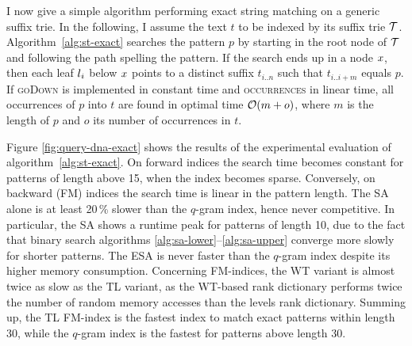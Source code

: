 I now give a simple algorithm performing exact string matching on a generic suffix trie.
In the following, I assume the text $t$ to be indexed by its suffix trie $\mathcal {T}$.
Algorithm~\ref{alg:st-exact} searches the pattern $p$ by starting in the root node of $\mathcal {T}$ and following the path spelling the pattern.
If the search ends up in a node $x$, then each leaf $l_i$ below $x$ points to a distinct suffix $t_{i..n}$ such that $t_{i..i+m}$ equals $p$.
If \textsc{goDown} is implemented in constant time and \textsc{occurrences} in linear time, all occurrences of $p$ into $t$ are found in optimal time $\mathcal{O}(m+o)$, where $m$ is the length of $p$ and $o$ its number of occurrences in $t$.

Figure \ref{fig:query-dna-exact} shows the results of the experimental evaluation of algorithm~\ref{alg:st-exact}.
On forward indices the search time becomes constant for patterns of length above 15, \ie when the index becomes sparse.
Conversely, on backward (FM) indices the search time is linear in the pattern length. 
The SA alone is at least 20\,\% slower than the $q$-gram index, hence never competitive.
In particular, the SA shows a runtime peak for patterns of length 10, due to the fact that binary search algorithms \ref{alg:sa-lower}--\ref{alg:sa-upper} converge more slowly for shorter patterns.
The ESA is never faster than the $q$-gram index despite its higher memory consumption.
Concerning FM-indices, the WT variant is almost twice as slow as the TL variant, as the WT-based rank dictionary performs twice the number of random memory accesses than the levels rank dictionary.
Summing up, the TL FM-index is the fastest index to match exact patterns within length 30, while the $q$-gram index is the fastest for patterns above length 30.


